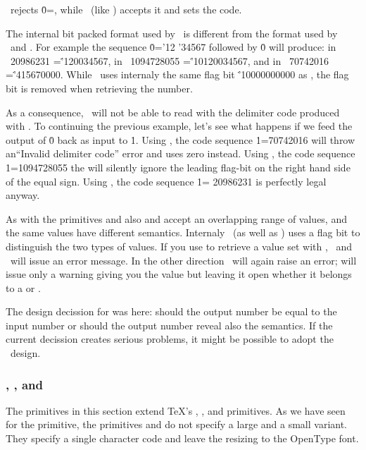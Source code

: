 \item \LuaTeX\ rejects \.{0=},
while \HiTeX\ (like \XeTeX) accepts it and sets the code.

\item The internal bit packed format used by \LuaTeX\ is different from the format used by \HiTeX\ and \XeTeX.
For example the sequence \.{0='12 '34567} followed by \.0 will produce: in \HiTeX\ 20986231 =\.{'120034567}, in \XeTeX\ 1094728055 =\.{'10120034567}, and in \LuaTeX\ 70742016 =\.{'415670000}.
While \HiTeX\ uses internaly the same flag bit \.{'10000000000}
as \XeTeX, the flag bit is removed when retrieving the number. 

As a consequence, \LuaTeX\ will not be able to read  with 
the  delimiter code produced with . To continuing the previous example,
let's see what happens if we feed the output of \.{0} back
as input to \.{1}.
Using \LuaTeX, the code sequence \.{1=70742016} will throw an``Invalid delimiter code'' error and uses zero instead.
Using \XeTeX, the code sequence \.{1=1094728055} the will silently ignore
the leading flag-bit on the right hand side of the equal sign.
Using \HiTeX, the code sequence \.{1= 20986231} is perfectly legal anyway.

\item As with the primitives  and  also
 and  accept an overlapping range of values, and the same
values have different semantics. Internaly \HiTeX\ (as well as \XeTeX) uses a flag bit
to distinguish the two types of values.
If you use  to retrieve a value set with , \HiTeX\ and \XeTeX\ will
issue an error message. In the other direction \XeTeX\ will again raise an error;
\HiTeX will issue only a warning
giving you the value but leaving it open whether it belongs to a  or .

The design decission for  was here:
should the output number be equal to the input number or should the output number reveal also
the semantics. If the current decission creates serious problems, it might be possible to adopt
the \XeTeX\ design.

\enditemize

\subsubsection{, , and  }
The primitives in this section extend \TeX's , , and  primitives.
As we have seen for the  primitive, the primitives  and 
do not specify a large and a small variant.
They specify a single character code and leave the resizing to the OpenType font.

